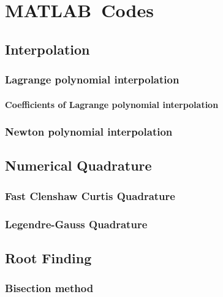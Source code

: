 \chapter{MATLAB\texttrademark\ Codes}


\section{Interpolation}
\subsection{Lagrange polynomial interpolation\label{lagrinterpol}}

\subsubsection{Coefficients of Lagrange polynomial interpolation\label{lagrinterpolde}}


\subsection{Newton polynomial interpolation\label{newpoly}}



\section{Numerical Quadrature}
\subsection{Fast Clenshaw Curtis Quadrature\label{fclencurt}}


\subsection{Legendre-Gauss Quadrature\label{lgwt}}



\section{Root Finding}
\subsection{Bisection method\label{bisect}}



